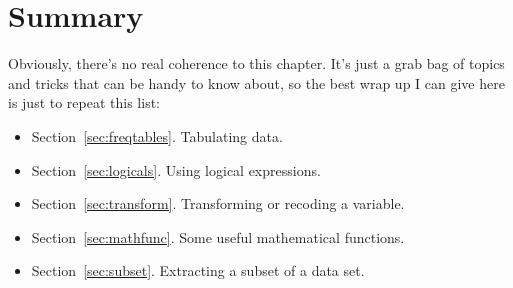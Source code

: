 \begin{comment}
\subsection{What other options are there?}

The advantage to the approach described in the previous section is that it solves a quite specific problem (but a commonly encountered one) with a minimum of fuss. The disadvantage is that the tools are quite limited in scope. They allow you to switch your data back and forth between two different formats that are very common in everyday data analysis. However, there a number of other tools that you can use if need be. Just within the core packages distributed with \R\ there is the \texttt{reshape()} function, as well as  the \texttt{stack()} and \texttt{unstack()} functions, all of which can be useful under certain circumstances. And there are of course thousands of packages on CRAN that you can use to help you with different tasks. One popular package for this purpose is the \texttt{reshape} package, written by Hadley Wickham \parencite[see][for details]{Wickham2007}. There are two key functions in this package, called \texttt{melt()} and \texttt{cast()} that are pretty useful for solving a lot of reshaping problems. In a future version of this book I intend to discuss \texttt{melt()} and \texttt{cast()} in a fair amount of detail.


\end{comment}


\section{Summary}

Obviously, there's no real coherence to this chapter. It's just a grab bag of topics and tricks that can be handy to know about, so the best wrap up I can give here is just to repeat this list:

\begin{itemize} 
\item Section~\ref{sec:freqtables}. Tabulating data.
\item Section~\ref{sec:logicals}. Using logical expressions.
\item Section~\ref{sec:transform}. Transforming or recoding a variable.
\item Section~\ref{sec:mathfunc}. Some useful mathematical functions.
\item Section~\ref{sec:subset}. Extracting a subset of a data set.
\end{itemize}



